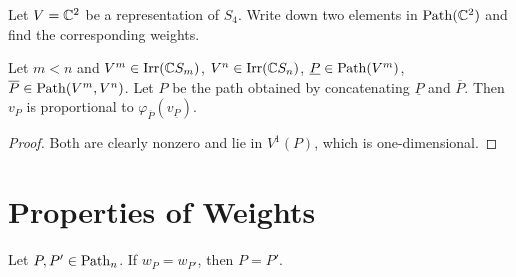 \begin{exercise}
  Let $V = \mathbb{C}^2$ be a representation
  of $S_4$. Write down two elements
  in $\operatorname{Path}(\mathbb{C}^2)$ and find the
  corresponding weights.
\end{exercise}

\begin{corollary}
  Let $m < n$ and $V^m \in \operatorname{Irr}(\mathbb{C} S_m)$,
  $V^n \in \operatorname{Irr}(\mathbb{C} S_n)$,
  $\underline{P} \in \operatorname{Path}(V^m)$,
  $\overline{P} \in \operatorname{Path}(V^m, V^n)$.
  Let $P$ be the path obtained by
  concatenating $\underline{P}$
  and $\overline{P}$. Then
  $v_P$ is proportional to
  $\varphi_{\overline{P}}(v_{\underline{P}})$.
\end{corollary}

\begin{proof}
  Both are clearly nonzero and
  lie in $V^1(P)$, which is one-dimensional.
\end{proof}

\section{Properties of Weights}
\begin{theorem}\label{thm:path-unique-weight}
  Let $P, P' \in \operatorname{Path}_n$. If
  $w_P = w_{P'}$, then $P = P'$.
\end{theorem}

